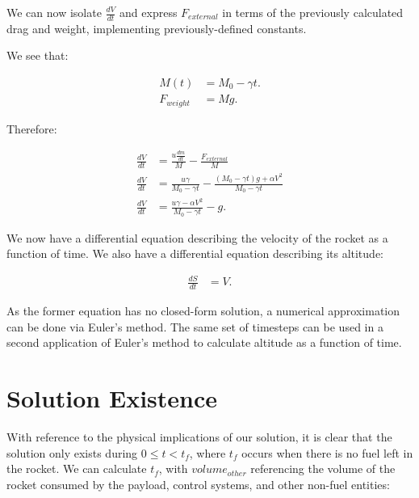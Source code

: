 \documentclass[]{article}
\begin{document}
We can now isolate $\frac{dV}{dt}$ and express $F_{external}$ in terms of the previously calculated drag and weight, implementing previously-defined constants.

We see that:

\begin{center}
	\begin{align*}
	M(t) &= M_0 - \gamma t . \\
	F_{weight} &= Mg .
	\end{align*}
\end{center}

Therefore:

\begin{center}
	\begin{align*}
	\frac{dV}{dt} &= \frac{u \frac{dm}{dt}}{M} - \frac{F_{external}}{M}  \\
	\frac{dV}{dt} &= \frac{u\gamma}{M_0 - \gamma t} - \frac{(M_0 - \gamma t)g + \alpha V^2}{M_0 - \gamma t} \\
	\frac{dV}{dt} &= \frac{u\gamma - \alpha V^2}{M_0 - \gamma t} - g .
	\end{align*}
\end{center}

We now have a differential equation describing the velocity of the rocket as a function of time. We also have a differential equation describing its altitude:

\begin{center}
	\begin{align*}
	\frac{dS}{dt} &= V .
	\end{align*}
\end{center}

As the former equation has no closed-form solution, a numerical approximation can be done via Euler's method. The same set of timesteps can be used in a second application of Euler's method to calculate altitude as a function of time.

\section{Solution Existence}

With reference to the physical implications of our solution, it is clear that the solution only exists during $0 \le t < t_{f}$, where $t_f$ occurs when there is no fuel left in the rocket. We can calculate $t_f$, with $volume_{other}$ referencing the volume of the rocket consumed by the payload, control systems, and other non-fuel entities:
\end{document}
